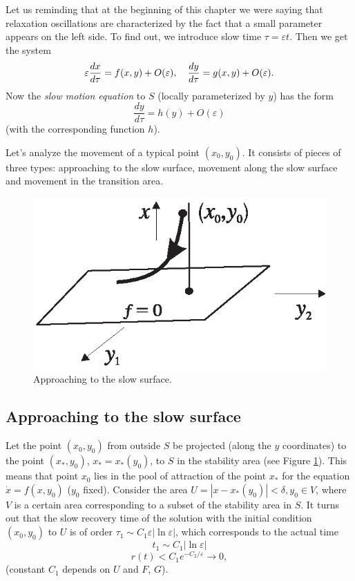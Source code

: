 Let us reminding that at the beginning of this chapter we were saying that relaxation oscillations are characterized by the fact that a small parameter appears on the left side. To find out, we introduce slow time $\tau =\varepsilon t$. Then we get the system
$$
\varepsilon \frac{dx}{d\tau }=f(x,y)+O(\varepsilon ),\text{ \ \ }\frac{dy}{%
	d\tau }=g(x,y)+O(\varepsilon ).
$$
Now the \emph{slow motion equation} to $S$ (locally parameterized by $y$) has the form
$$
\frac{dy}{d\tau }=h(y)+O(\varepsilon )
$$
(with the corresponding function $ h$).

Let's analyze the movement of a typical point $(x_0, y_0)$. It consists of pieces of three types: approaching to the slow surface, movement along the slow surface and movement in the transition area.

\begin{figure}[!ht]
	\centering
	\includegraphics [scale=1.4]{jtr46}
	\caption{Approaching to the slow surface.}
	\label{fig:4.6}
\end{figure}

\subsection{Approaching to the slow surface}
Let the point $(x_0, y_0)$ from outside $S$ be projected (along the $y$ coordinates) to the point $(x_*, y_0)$, $x_* = x_* (y_0)$, to $S$ in the stability area (see Figure \ref{fig:4.6}). This means that point $x_0$ lies in the pool of attraction of the point $x_*$ for the equation $\dot{x} = f (x, y_0)$ ($y_0$ fixed). Consider the area $U = {\left| x - x_* (y_0) \right| <\delta, y_0 \in V}$, where $V$ is a certain area corresponding to a subset of the stability area in $S$. It turns out that the slow recovery time of the solution with the initial condition $(x_0, y_0)$ to $U$ is of order $\tau_1 \sim C_1 \varepsilon \left|\ln \varepsilon\right|$, which corresponds to the actual time
$$
t_1 \sim C_1  \left|\ln \varepsilon\right|
$$
$$
r(t)<C_{1}e^{-C_{2}/\varepsilon }\rightarrow 0,
$$
(constant $C_1$ depends on $U$ and $F$, $G$).

